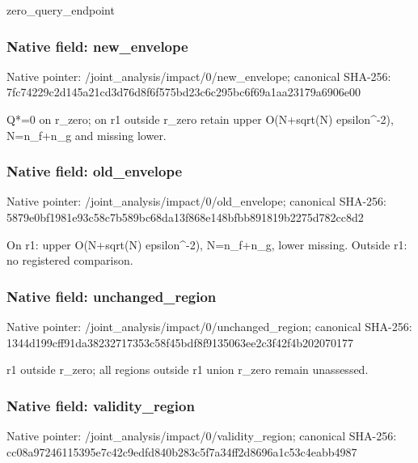 \documentclass[10pt,a4paper]{article}
\begin{document}
\begingroup\raggedright\sloppy zero\_\allowbreak{}query\_\allowbreak{}endpoint\par\endgroup

\subsubsection{Native field: new\_\allowbreak{}envelope}
Native pointer: /joint\_\allowbreak{}analysis/impact/0/new\_\allowbreak{}envelope; canonical SHA-256: 7fc74229c2d145a21cd3d76d8f6f575bd23c6c295bc6f69a1aa23179a6906e00

\begingroup\raggedright\sloppy Q*=\allowbreak{}0 on r\_\allowbreak{}zero;\allowbreak{} on r1 outside r\_\allowbreak{}zero retain upper O(N+sqrt(N) epsilon\textasciicircum{}-2),\allowbreak{} N=\allowbreak{}n\_\allowbreak{}f+n\_\allowbreak{}g and missing lower.\par\endgroup

\subsubsection{Native field: old\_\allowbreak{}envelope}
Native pointer: /joint\_\allowbreak{}analysis/impact/0/old\_\allowbreak{}envelope; canonical SHA-256: 5879e0bf1981e93c58c7b589bc68da13f868e148bfbb891819b2275d782cc8d2

\begingroup\raggedright\sloppy On r1:\allowbreak{} upper O(N+sqrt(N) epsilon\textasciicircum{}-2),\allowbreak{} N=\allowbreak{}n\_\allowbreak{}f+n\_\allowbreak{}g,\allowbreak{} lower missing. Outside r1:\allowbreak{} no registered comparison.\par\endgroup

\subsubsection{Native field: unchanged\_\allowbreak{}region}
Native pointer: /joint\_\allowbreak{}analysis/impact/0/unchanged\_\allowbreak{}region; canonical SHA-256: 1344d199cff91da38232717353c58f45bdf8f9135063ee2c3f42f4b202070177

\begingroup\raggedright\sloppy r1 outside r\_\allowbreak{}zero;\allowbreak{} all regions outside r1 union r\_\allowbreak{}zero remain unassessed.\par\endgroup

\subsubsection{Native field: validity\_\allowbreak{}region}
Native pointer: /joint\_\allowbreak{}analysis/impact/0/validity\_\allowbreak{}region; canonical SHA-256: cc08a97246115395e7c42c9edfd840b283c5f7a34ff2d8696a1c53c4eabb4987
\end{document}
